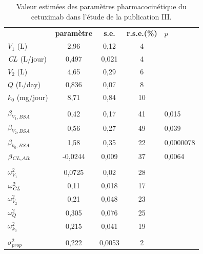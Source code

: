 \begin{table}[!ht]
  \centering
  \caption{Valeur estimées des paramètres pharmacocinétique du cetuximab dans l'étude de la publication III.}
    \begin{tabular}{lcccl}
       &  &  &  &  \\
      \hline
      \textbf{} & \textbf{paramètre} & \textbf{s.e.} & \textbf{r.s.e.(\%)} & $p$ \\
      \hline
      \hline
      $V_1$ (L) & 2,96 & 0,12 & 4 &  \\
      $\operatorname{\textit{CL}}$ (L/jour) & 0,497 & 0,021 & 4 &  \\
      $V_2$ (L) & 4,65 & 0,29 & 6 &  \\
      $Q$ (L/day) & 0,836 & 0,07 & 8 &  \\
      $k_0$ (mg/jour) & 8,71 & 0,84 & 10 &  \\
       &  &  &  &  \\
      $\beta_{V_1,BSA}$ & 0,42 & 0,17 & 41 & 0,015 \\
      $\beta_{V_2,BSA}$ & 0,56 & 0,27 & 49 & 0,039 \\
      $\beta_{k_0,BSA}$ & 1,58 & 0,35 & 22 & 0,0000078 \\
      $\beta_{\operatorname{\textit{CL}},Alb}$  & -0,0244 & 0,009 & 37 & 0,0064 \\
       &  &  &  &  \\
      $\omega^2_{V_1}$ & 0,0725 & 0,02 & 28 &  \\
      $\omega^2_{\operatorname{\textit{CL}}}$ & 0,11 & 0,018 & 17 &  \\
      $\omega^2_{V_2}$ & 0,21 & 0,048 & 23 &  \\
      $\omega^2_{Q}$ & 0,305 & 0,076 & 25 &  \\
      $\omega^2_{k_0}$ & 0,215 & 0,041 & 19 &  \\
       &  &  &  &  \\
      $\sigma^2_{prop}$ & 0,222 & 0,0053 & 2 &  \\
      \hline
    \end{tabular}
  \label{tab:4}
\end{table}
 
